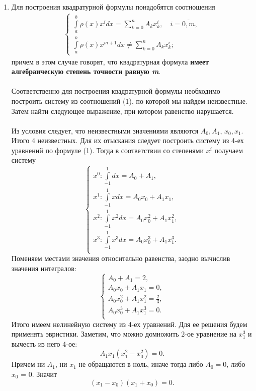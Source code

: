 \documentclass[a4paper, 12pt]{article}
\begin{document}
\begin{enumerate}
		\newpage
		\item 
		\hypertarget{t2}{}
		Для построения квадратурной формулы понадобятся соотношения \begin{eqnarray}
			\begin{cases}
				\int\limits_a^b \rho(x) x^idx = \sum\limits_{k=0}^{n}A_kx^i_k,\quad i=\overline{0,m},\\
				\int\limits_a^b \rho(x) x^{m+1}dx \ne \sum\limits_{k=0}^{n}A_kx^i_k;
			\end{cases}
		\end{eqnarray}
		причем в этом случае говорят, что квадратурная формула \textbf{имеет алгебраическую степень точности равную \textit{m}}.\\\\
		Соответственно для построения квадратурной формулы необходимо построить систему из соотношений (1), по которой мы найдем неизвестные. Затем найти следующее выражение, при котором равенство нарушается.\\\\
		Из условия следует, что неизвестными значениями являются $A_0, A_1$, $x_0, x_1$. Итого 4 неизвестных. Для их отыскания следует построить систему из 4-ех уравнений по формуле (1). Тогда в соответствии со степенями $x^i$ получаем систему $$\begin{cases}
			x^0 : \int\limits_{-1}^1 dx = A_0 + A_1,\\
			x^1 : \int\limits_{-1}^1 xdx = A_0x_0 + A_1x_1,\\
			x^2 : \int\limits_{-1}^1 x^2dx = A_0x_0^2 + A_1x_1^2,\\
			x^3 : \int\limits_{-1}^1 x^3dx = A_0x_0^3 + A_1x_1^3.\\
		\end{cases}$$ 
		Поменяем местами значения относительно равенства, заодно вычислив значения интегралов:
		$$\begin{cases}
			A_0 + A_1 = 2,\\
			A_0x_0 + A_1x_1 = 0,\\
			A_0x_0^2 + A_1x_1^2 = \frac23,\\
			A_0x_0^3 + A_1x_1^3 = 0.\\
		\end{cases}$$ 
		Итого имеем нелинейную систему из 4-ех уравнений. Для ее решения будем применять эвристики. Заметим, что можно домножить 2-ое уравнение на $x_1^3$ и вычесть из него 4-ое:
		$$A_1x_1(x_1^2 - x_0^2) = 0.$$
		Причем ни $A_1$, ни $x_1$ не обращаются в ноль, иначе тогда либо $A_0=0$, либо $x_0$ = 0. Значит $$(x_1-x_0)(x_1+x_0) = 0.$$

\end{enumerate}
\end{document}
